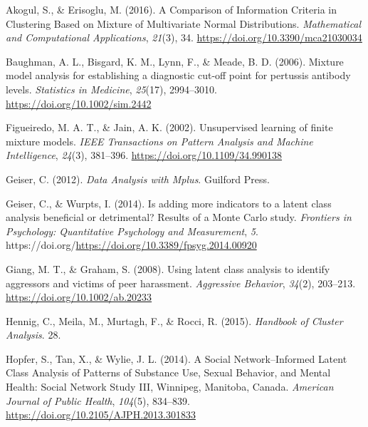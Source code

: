 \documentclass[
  ,man,floatsintext]{apa6}
\newlength{\cslhangindent}
\newlength{\cslentryspacingunit} %
\newenvironment{CSLReferences}[2] %
 {%
  \setlength{\parindent}{0pt}
  \ifodd #1
  \let\oldpar\par
  \def\par{\hangindent=\cslhangindent\oldpar}
  \fi
  \setlength{\parskip}{#2\cslentryspacingunit}
 }%
 {}
\begin{document}
\hypertarget{refs}{}
\begin{CSLReferences}{1}{0}
\leavevmode{}%
Akogul, S., \& Erisoglu, M. (2016). A {Comparison} of {Information} {Criteria} in {Clustering} {Based} on {Mixture} of {Multivariate} {Normal} {Distributions}. \emph{Mathematical and Computational Applications}, \emph{21}(3), 34. \url{https://doi.org/10.3390/mca21030034}

\leavevmode{}%
Baughman, A. L., Bisgard, K. M., Lynn, F., \& Meade, B. D. (2006). Mixture model analysis for establishing a diagnostic cut-off point for pertussis antibody levels. \emph{Statistics in Medicine}, \emph{25}(17), 2994--3010. \url{https://doi.org/10.1002/sim.2442}

\leavevmode{}%
Figueiredo, M. A. T., \& Jain, A. K. (2002). Unsupervised learning of finite mixture models. \emph{IEEE Transactions on Pattern Analysis and Machine Intelligence}, \emph{24}(3), 381--396. \url{https://doi.org/10.1109/34.990138}

\leavevmode{}%
Geiser, C. (2012). \emph{Data {Analysis} with {Mplus}}. Guilford Press.

\leavevmode{}%
Geiser, C., \& Wurpts, I. (2014). Is adding more indicators to a latent class analysis beneficial or detrimental? {Results} of a {Monte} {Carlo} study. \emph{Frontiers in Psychology: Quantitative Psychology and Measurement}, \emph{5}. https://doi.org/\url{https://doi.org/10.3389/fpsyg.2014.00920}

\leavevmode{}%
Giang, M. T., \& Graham, S. (2008). Using latent class analysis to identify aggressors and victims of peer harassment. \emph{Aggressive Behavior}, \emph{34}(2), 203--213. \url{https://doi.org/10.1002/ab.20233}

\leavevmode{}%
Hennig, C., Meila, M., Murtagh, F., \& Rocci, R. (2015). \emph{Handbook of {Cluster} {Analysis}}. 28.

\leavevmode{}%
Hopfer, S., Tan, X., \& Wylie, J. L. (2014). A {Social} {Network}--{Informed} {Latent} {Class} {Analysis} of {Patterns} of {Substance} {Use}, {Sexual} {Behavior}, and {Mental} {Health}: {Social} {Network} {Study} {III}, {Winnipeg}, {Manitoba}, {Canada}. \emph{American Journal of Public Health}, \emph{104}(5), 834--839. \url{https://doi.org/10.2105/AJPH.2013.301833}


\end{CSLReferences}
\end{document}
